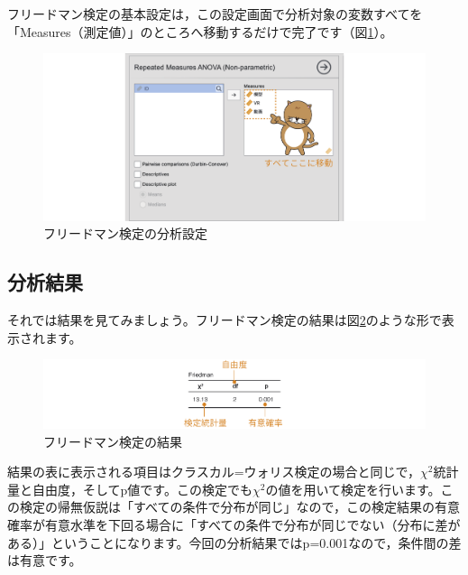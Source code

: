\documentclass[
  12pt,
  a5jpaper,
  lualatex, ja=standard]{bxjsbook}
\begin{document}
フリードマン検定の基本設定は，この設定画面で分析対象の変数すべてを「Measures（測定値）」のところへ移動するだけで完了です（図\ref{fig:ANOVA-friedman-set-var}）。

\begin{figure}[!ht]

{\centering \includegraphics[width=1\linewidth]{images/ANOVA/friedman-set-var} 

}

\caption{フリードマン検定の分析設定}\label{fig:ANOVA-friedman-set-var}
\end{figure}

\hypertarget{sub:ANOVA-friedman-results}{%
\subsection{分析結果}\label{sub:ANOVA-friedman-results}}

それでは結果を見てみましょう。フリードマン検定の結果は図\ref{fig:ANOVA-friedman-results}のような形で表示されます。

\begin{figure}[!ht]

{\centering \includegraphics[width=1\linewidth]{images/ANOVA/friedman-results} 

}

\caption{フリードマン検定の結果}\label{fig:ANOVA-friedman-results}
\end{figure}

結果の表に表示される項目はクラスカル=ウォリス検定の場合と同じで，\(\chi^2\)統計量と自由度，そしてp値です。この検定でも\(\chi^2\)の値を用いて検定を行います。この検定の帰無仮説は「すべての条件で分布が同じ」なので，この検定結果の有意確率が有意水準を下回る場合に「すべての条件で分布が同じでない（分布に差がある）」ということになります。今回の分析結果ではp=0.001なので，条件間の差は有意です。
\end{document}
